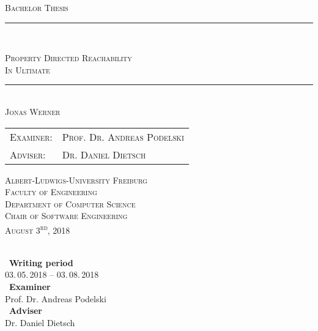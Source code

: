 \documentclass[11pt, a4paper, BCOR=10mm, ngerman, oneside]{scrbook}
\begin{document}
\begin{titlepage}
\begin{center}

\newcommand{\HorizontalLine}{\rule{\linewidth}{0.3mm}}

	{\scshape\Large Bachelor Thesis\par}


\HorizontalLine \\[0.4cm]
	{\huge\scshape Property Directed Reachability \\ \Large{In Ultimate} \par}
\HorizontalLine \\[1.5cm]


	{\Large \scshape Jonas Werner}\\[5cm]


\begin{tabular}[scshape]{>{\normalsize}l >{\normalsize}l}
  \scshape Examiner: & \scshape Prof. Dr. Andreas Podelski\\[0.3cm]
  \scshape Adviser: & \scshape Dr. Daniel Dietsch  \\[1.2cm]
\end{tabular}
\vfill  %

\large { \scshape
    Albert-Ludwigs-University Freiburg\\
    Faculty of Engineering\\
    Department of Computer Science\\
    Chair of Software Engineering \\[1cm]

    August 3\textsuperscript{rd}, 2018\\
}
\end{center}
\end{titlepage}

    \pagestyle{plain} %
    \frontmatter  %

\ \vfill \ \\  %
\
\textbf{Writing period}            \smallskip{} \\
03.\,05.\,2018 -- 03.\,08.\,2018   \bigskip{} \\
\
\textbf{Examiner}                  \smallskip{} \\
Prof. Dr. Andreas Podelski \bigskip{} \\
\
\textbf{Adviser}                  \smallskip{} \\
Dr. Daniel Dietsch
\end{document}
